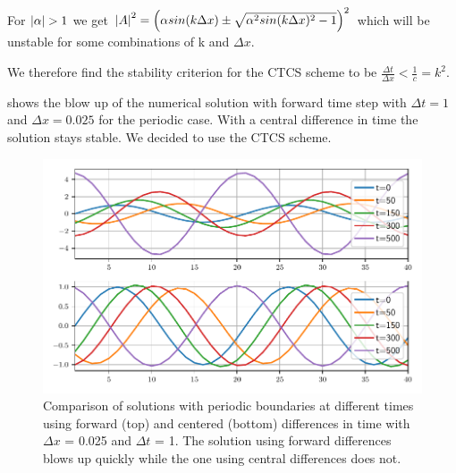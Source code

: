For $\abs{\alpha} > 1$ we get $\abs{A}^2 = \left( \alpha sin(k\Delta x) \pm \sqrt{\alpha^2 sin(k\Delta x)^2 -1 }\right)^2$ which will be unstable for some combinations of k and $\Delta x$.

We therefore find the stability criterion for the CTCS scheme to be
$ \frac{\Delta t}{\Delta x} < \frac{1}{c} = k^2$.



 shows the blow up of the numerical solution with forward
time step with $\Delta t = 1$ and $\Delta x = 0.025$ for the periodic case.
With a central difference in time the solution stays stable.
We decided to use the CTCS scheme.


\begin{figure}[h]
  \centering
  \includegraphics[width=\textwidth]{../figures/compare_dt_1.pdf}
  \caption{Comparison of solutions with periodic boundaries
  at different times using forward (top) and
  centered (bottom) differences in time with $\Delta x$ = 0.025 and $\Delta t$
  = 1. The solution using forward differences
  blows up quickly while the one using central differences does not.}
  \label{fig:compare}
\end{figure}
